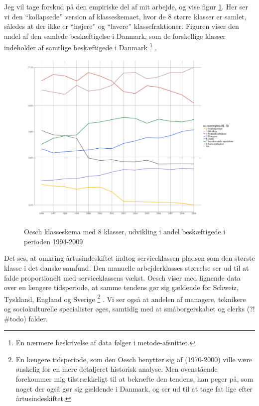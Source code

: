 Jeg vil tage forskud på den empiriske del af mit arbejde, og vise figur \ref{fig teori tid Oesch8}. Her ser vi den “kollapsede” version af klasseskemaet, hvor de 8 større klasser er samlet, således at der ikke er “højere” og “lavere” klassefraktioner. \label{henvisning til Oesch}Figuren viser den andel af den samlede beskæftigelse i Danmark, som de forskellige klasser indeholder af samtlige beskæftigede i Danmark%
%
		\footnote{ En nærmere beskrivelse af data følger i metode-afsnittet.}%
%
. 


%
   \begin{figure}[H]
   \begin{centering}
   	\caption[Tidsserie: Oesch-8 klasseskema]{Oesch klasseskema med 8 klasser, udvikling i andel beskæftigede i perioden 1994-2009}
   	\includegraphics[width=\textwidth]{fig/tidsserier/tid_Oesch8.pdf}
   	\label{fig teori tid Oesch8}
   \end{centering}
   \end{figure}   
%

Det ses, at omkring årtusindeskiftet indtog serviceklassen pladsen som den største klasse i det danske samfund. Den manuelle arbejderklasses størrelse ser ud til at falde proportionelt med serviceklassens vækst. Oesch viser med lignende data over en længere tidsperiode, at samme tendens gør sig gældende for Schweiz, Tyskland, England og Sverige%
		\footnote{ En længere tidsperiode, som den Oesch benytter sig af (1970-2000) ville være ønskelig for en mere detaljeret historisk analyse. Men ovenstående forekommer mig tilstrækkeligt til at bekræfte den tendens, han peger på, som noget der også gør sig gældende i Danmark, og ser ud til at tage fat lige efter årtusindeskiftet.}%
%
. Vi ser også at andelen af managere, teknikere og sociokulturelle specialister øges, samtidig med at småborgerskabet og clerks (?! \#todo) falder. 


